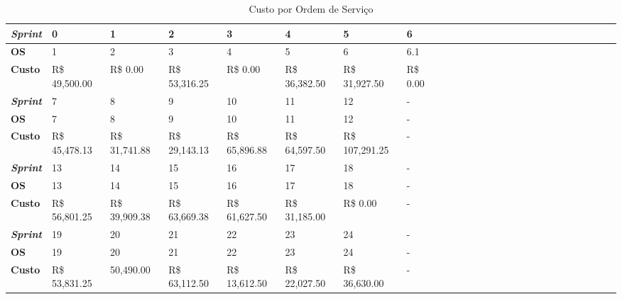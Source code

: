 \begin{table}[h]
\footnotesize
\center
\begin{tabular}{|l|l|l|l|l|l|l|l|l|l|l|l|l|l|l|l|l|l|l|l|l|l|l|l|l|l|}
\hline
\textbf{\textit{Sprint}} & 0   & 1 &  2 & 3 & 4 & 5 & 6  \\ \hline
\textbf{OS} & 1 &  2 & 3 & 4 & 5 & 6 & 6.1 \\ \hline
\textbf{Custo}  & R\$                    49,500.00   & R\$                                 0.00   & R\$                    53,316.25    & R\$                                 0.00    & R\$                    36,382.50         & R\$                    31,927.50   & R\$                                 0.00                  \\ \hline \hline
\textbf{\textit{Sprint}}  & 7 & 8 &  9 & 10 & 11 & 12 &-\\ \hline
\textbf{OS}  & 7 & 8 &  9 & 10 & 11 & 12 &- \\ \hline
\textbf{Custo}        & R\$                    45,478.13                                                                                      & R\$                    31,741.88   &   R\$                    29,143.13                                        & R\$                    65,896.88          &  R\$                    64,597.50  & R\$                  107,291.25   &-      \\ \hline \hline
\textbf{\textit{Sprint}} & 13 & 14 & 15 & 16 &  17 & 18  &-\\ \hline
\textbf{OS} & 13 & 14 & 15 & 16 &  17 & 18 &-  \\ \hline
\textbf{Custo}  & R\$                    56,801.25         & R\$                    39,909.38       & R\$                    63,669.38        &  R\$                    61,627.50  &  R\$                    31,185.00        &R\$                                 0.00                                                   &-       \\ \hline \hline
\textbf{\textit{Sprint}} & 19 & 20 & 21 & 22 & 23 & 24&-  \\ \hline
\textbf{OS} & 19 & 20 & 21 & 22 & 23 & 24&- \\ \hline
\textbf{Custo}  &  R\$                    53,831.25  &      50,490.00 & R\$                    63,112.50     & R\$                    13,612.50       & R\$                    22,027.50       &  R\$                    36,630.00 &-                                                        \\ \hline

\end{tabular}
\caption{Custo por Ordem de Serviço}
		\label{custo}
\end{table}


